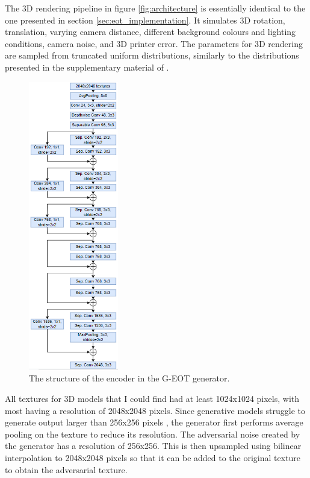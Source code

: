 The 3D rendering pipeline in figure \ref{fig:architecture} is essentially identical to the one presented in section \ref{sec:eot_implementation}. It simulates 3D rotation, translation, varying camera distance, different background colours and lighting conditions, camera noise, and 3D printer error. The parameters for 3D rendering are sampled from truncated uniform distributions, similarly to the distributions presented in the supplementary material of \cite{athalye}. 

\begin{figure}
    \centering
    \includegraphics[width=0.35\textwidth]{graphics/g_eot_encoder.PNG}
    \caption{The structure of the encoder in the G-EOT generator.}
    \label{fig:proposed_encoder}
\end{figure}

All textures for 3D models that I could find had at least 1024x1024 pixels, with most having a resolution of 2048x2048 pixels. Since generative models struggle to generate output larger than 256x256 pixels \cite{big_gan}, the generator first performs average pooling on the texture to reduce its resolution. The adversarial noise created by the generator has a resolution of 256x256. This is then upsampled using bilinear interpolation to 2048x2048 pixels so that it can be added to the original texture to obtain the adversarial texture.

